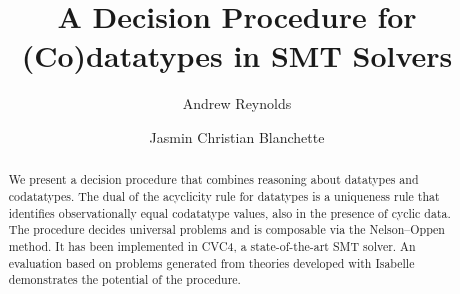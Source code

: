\usepackage[
   a4paper,
   pdftex,
   pdftitle={A Decision Procedure for (Co)datatypes in SMT Solvers},
   pdfauthor={Andrew Reynolds and Jasmin Christian Blanchette},
   pdfkeywords={},
   pdfborder={0 0 0},
   draft=false,
   bookmarksnumbered,
   bookmarks,
   bookmarksdepth=2,
   bookmarksopenlevel=2,
   bookmarksopen]{hyperref}


\global\def\figurename{Figure}
\global\def\figuresname{Figures}


\makeatletter
\ps@myheadings
\makeatother







\title{A Decision Procedure for (Co)datatypes in SMT Solvers}

\author {Andrew Reynolds \and Jasmin Christian Blanchette}

\maketitle

\smallskipamount

\begin{nomemoriam}
\noindent\hfill\emph{\phantom{In memoriam Morgan Deters 1979--2015}}

\vspace*{-6\smallskipamount}
\end{nomemoriam}
\begin{memoriam}
\noindent\hfill\emph{}
\end{memoriam}

\begin{abstract}
We present a decision procedure that combines reasoning about
datatypes and codatatypes. The dual of the acyclicity rule for datatypes is a
uniqueness rule that identifies observationally equal codatatype values, also in the presence of
cyclic data. The procedure decides universal
problems and is composable via the Nelson--Oppen method. It has been
implemented in CVC4, a state-of-the-art SMT solver. An evaluation based on
problems generated from theories developed with Isabelle demonstrates the
potential of the procedure.
\end{abstract}

